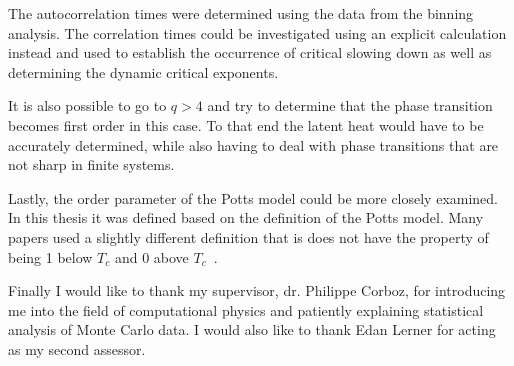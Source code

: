 \documentclass[11pt, a4paper]{report} %
\begin{document}
The autocorrelation times were determined using the data from the binning analysis.
The correlation times could be investigated using an explicit calculation instead and used to establish the occurrence of critical slowing down as well as determining the dynamic critical exponents.

It is also possible to go to \(q > 4\) and try to determine that the phase transition becomes first order in this case.
To that end the latent heat would have to be accurately determined, while also having to deal with phase transitions that are not sharp in finite systems.

Lastly, the order parameter of the Potts model could be more closely examined.
In this thesis it was defined based on the definition of the Potts model.
Many papers used a slightly different definition that is does not have the property of being 1 below \(T_c\) and 0 above \(T_c\)~\cite{binder:1981a,wu:1982,fan:2007}.

\vspace*{\baselineskip}
\noindent
Finally I would like to thank my supervisor, dr. Philippe Corboz, for introducing me into the field of computational physics and patiently explaining statistical analysis of Monte Carlo data.
I would also like to thank Edan Lerner for acting as my second assessor.


% 
% 
\printbibliography
\end{document}
